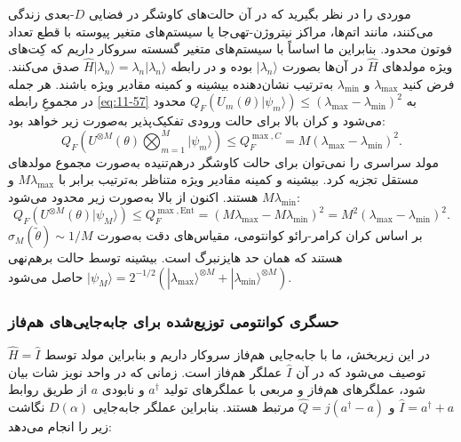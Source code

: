 موردی را در نظر بگیرید که در آن حالت‌های کاوشگر در فضایی $D$-بعدی زندگی می‌کنند، مانند اتم‌ها، مراکز نیتروژن-تهی‌جا یا سیستم‌های متغیر پیوسته با قطع تعداد فوتون محدود. بنابراین ما اساساً با سیستم‌های متغیر گسسته \cite{27,28,29} سروکار داریم که کِت‌های ویژه مولدهای $\hat{H}$ در آن‌ها بصورت $|\lambda_n\rangle$ بوده و در رابطه $\hat{H}|\lambda_n\rangle = \lambda_n |\lambda_n\rangle$ صدق می‌کنند. فرض کنید $\lambda_{\max}$ و $\lambda_{\min}$ به‌ترتیب نشان‌دهنده بیشینه و کمینه مقادیر ویژه باشند. هر جمله در مجموعِ رابطه \eqref{eq:11-57} به $Q_F(U_m(\theta) |\psi_m\rangle) \leq (\lambda_{\max} - \lambda_{\min})^2$ محدود می‌شود و کران بالا برای حالت ورودی تفکیک‌پذیر به‌صورت زیر خواهد بود:
\begin{equation}
	Q_F \left( U^{\otimes M}(\theta) \bigotimes_{m=1}^{M} |\psi_m\rangle \right) \leq Q_F^{\max, C} = M(\lambda_{\max} - \lambda_{\min})^2.
	\label{eq:11-59}
\end{equation}
مولد سراسری را نمی‌توان برای حالت کاوشگر درهم‌تنیده به‌صورت مجموع مولدهای مستقل تجزیه کرد. بیشینه و کمینه مقادیر ویژه متناظر به‌ترتیب برابر با $M \lambda_{\max}$ و $M \lambda_{\min}$ هستند.  اکنون از بالا به‌صورت زیر محدود می‌شود:
\begin{equation}
	Q_F (U^{\otimes M}(\theta) |\psi_M\rangle) \leq Q_F^{\max, \text{Ent}} = (M\lambda_{\max} - M\lambda_{\min})^2 = M^2 (\lambda_{\max} - \lambda_{\min})^2.
	\label{eq:11-60}
\end{equation}
بر اساس کران کرامر-رائو کوانتومی، مقیاس‌های دقت به‌صورت $\sigma_M(\tilde{\theta}) \sim 1/M$ هستند که همان حد هایزنبرگ است. بیشینه  توسط حالت برهم‌نهی $|\psi_M\rangle = 2^{-1/2} (|\lambda_{\max}\rangle^{\otimes M} + |\lambda_{\min}\rangle^{\otimes M})$ حاصل می‌شود.

\subsubsection{حسگری کوانتومی توزیع‌شده برای جابه‌جایی‌های هم‌فاز}
\label{sec:11-3-1}
در این زیربخش، ما با جابه‌جایی هم‌فاز سروکار داریم و بنابراین مولد توسط $\hat{H} = \hat{I}$ توصیف می‌شود که در آن $\hat{I}$ عملگر هم‌فاز است. زمانی که در واحد نویز شات بیان شود، عملگرهای هم‌فاز و مربعی با عملگرهای تولید $a^\dagger$ و نابودی $a$ از طریق روابط $\hat{I} = a^\dagger + a$ و $\hat{Q} = j(a^\dagger - a)$ مرتبط هستند. بنابراین عملگر جابه‌جایی $D(\alpha)$ نگاشت زیر را انجام می‌دهد:

